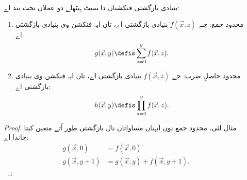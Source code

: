 \documentclass[../../../include/open-logic-section]{subfiles}
\begin{document}
\begin{prop}
بنیادی بازگشتی فنکشناں دا سیٹ
ہیٹھلے دو عملاں تحت بند اے:
\begin{enumerate}
\item محدود جمع: جے $f(\vec x, z)$ بنیادی بازگشتی اے،
تاں ایہ فنکشن وی بنیادی بازگشتی اے:
\[
g(\vec x, y) \defis \sum_{z = 0}^y f(\vec x, z).
\]
\item محدود حاصلِ ضرب: جے $f(\vec x, z)$ بنیادی بازگشتی اے،
تاں ایہ فنکشن وی بنیادی بازگشتی اے:
\[
h(\vec x, y) \defis \prod_{z = 0}^y f(\vec x, z).
\]
\end{enumerate}
\end{prop}

\begin{proof}
مثال لئی، محدود جمع نوں ایہناں
مساواتاں نال بازگشتی طور اُتے
متعین کیتا جاندا اے:
\begin{align*}
  g(\vec x, 0) & = f(\vec x, 0)\\
  g(\vec x, y+1) & = g(\vec x, y) + f(\vec x, y+1).
\end{align*}
\end{proof}
\end{document}
